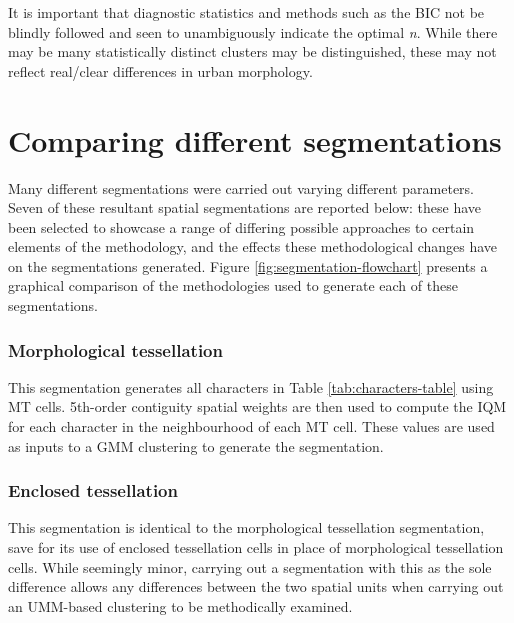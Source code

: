 \documentclass[a4paper, nobind]{templates/ociamthesis}
\begin{document}
It is important that diagnostic statistics and methods such as the BIC not be blindly followed and seen to unambiguously indicate the optimal \emph{n}. While there may be many statistically distinct clusters may be distinguished, these may not reflect real/clear differences in urban morphology.

\hypertarget{comparing-different-segmentations}{%
\section{Comparing different segmentations}\label{comparing-different-segmentations}}

Many different segmentations were carried out varying different parameters. Seven of these resultant spatial segmentations are reported below: these have been selected to showcase a range of differing possible approaches to certain elements of the methodology, and the effects these methodological changes have on the segmentations generated. Figure \ref{fig:segmentation-flowchart} presents a graphical comparison of the methodologies used to generate each of these segmentations.

\hypertarget{morphological-tessellation-1}{%
\subsubsection{Morphological tessellation}\label{morphological-tessellation-1}}

This segmentation generates all characters in Table \ref{tab:characters-table} using MT cells. 5th-order contiguity spatial weights are then used to compute the IQM for each character in the neighbourhood of each MT cell. These values are used as inputs to a GMM clustering to generate the segmentation.

\hypertarget{enclosed-tessellation-1}{%
\subsubsection{Enclosed tessellation}\label{enclosed-tessellation-1}}

This segmentation is identical to the morphological tessellation segmentation, save for its use of enclosed tessellation cells in place of morphological tessellation cells. While seemingly minor, carrying out a segmentation with this as the sole difference allows any differences between the two spatial units when carrying out an UMM-based clustering to be methodically examined.
\end{document}
